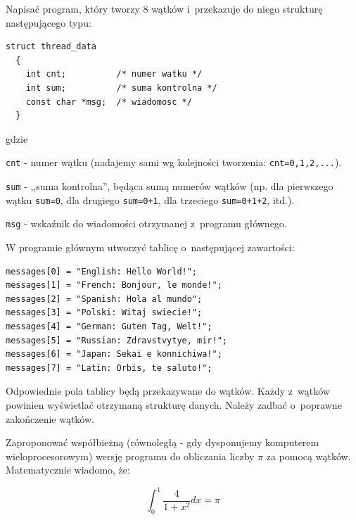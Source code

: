 \begin{myenumerate}
\item Napisać program, który tworzy $8$ wątków i~przekazuje do niego strukturę następującego typu:

\begin{lstlisting}[style=MyCStyle]
struct thread_data
  {
    int	cnt;          /* numer watku */
    int sum;          /* suma kontrolna */
    const char *msg;  /* wiadomosc */
  }
\end{lstlisting}

gdzie

\begin{myitemize}
  \item \lstinline[style=MyCStyle]{cnt} - numer wątku (nadajemy sami wg kolejności tworzenia: \lstinline[style=MyCStyle]{cnt=0,1,2,...}).
\item \lstinline[style=MyCStyle]{sum} - ,,suma kontrolna'', będąca sumą numerów wątków (np. dla pierwszego wątku \mbox{\lstinline[style=MyCStyle]{sum=0}}, dla drugiego \lstinline[style=MyCStyle]{sum=0+1}, dla trzeciego \lstinline[style=MyCStyle]{sum=0+1+2}, itd.).
\item \lstinline[style=MyCStyle]{msg} - wskaźnik do wiadomości otrzymanej z~programu głównego.
\end{myitemize}

W programie głównym utworzyć tablicę o~następującej zawartości:

\begin{lstlisting}[style=MyCStyle]
messages[0] = "English: Hello World!";
messages[1] = "French: Bonjour, le monde!";
messages[2] = "Spanish: Hola al mundo";
messages[3] = "Polski: Witaj swiecie!";
messages[4] = "German: Guten Tag, Welt!";
messages[5] = "Russian: Zdravstvytye, mir!";
messages[6] = "Japan: Sekai e konnichiwa!";
messages[7] = "Latin: Orbis, te saluto!";
\end{lstlisting}

Odpowiednie pola tablicy będą przekazywane do wątków. Każdy z~wątków powinien wyświetlać otrzymaną strukturę danych. Należy zadbać o~poprawne zakończenie wątków.

\item Zaproponować współbieżną (równoległą - gdy dysponujemy komputerem wieloprocesorowym) wersję programu do obliczania liczby $\pi$ za pomocą wątków. Matematycznie wiadomo, że:

\begin{equation}\nonumber
\displaystyle\int_0^1{\frac{4}{1+x^2}dx}=\pi
\end{equation}


\end{myenumerate}

